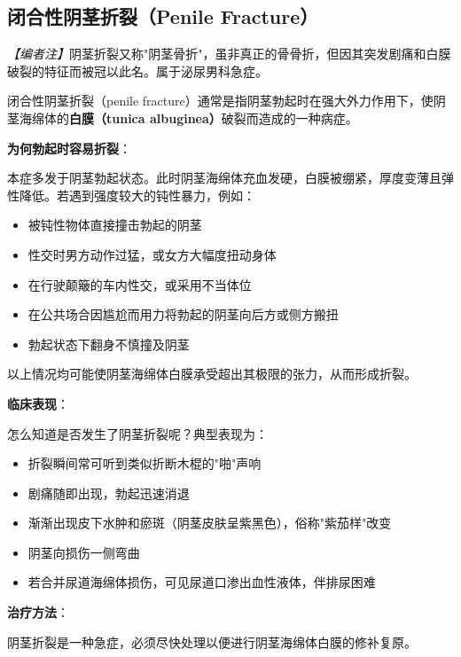 \documentclass[12pt,a4paper,twoside]{ctexbook}
\begin{document}
\subsection{闭合性阴茎折裂（Penile Fracture）}

\noindent\textit{【编者注】}阴茎折裂又称"阴茎骨折"，虽非真正的骨骨折，但因其突发剧痛和白膜破裂的特征而被冠以此名。属于泌尿男科急症。

\vspace{0.5em}
闭合性阴茎折裂（penile fracture）通常是指阴茎勃起时在强大外力作用下，使阴茎海绵体的\textbf{白膜（tunica albuginea）}破裂而造成的一种病症。

\vspace{0.5em}
\noindent\textbf{为何勃起时容易折裂}：

本症多发于阴茎勃起状态。此时阴茎海绵体充血发硬，白膜被绷紧，厚度变薄且弹性降低。若遇到强度较大的钝性暴力，例如：
\begin{itemize}
	\item 被钝性物体直接撞击勃起的阴茎
	\item 性交时男方动作过猛，或女方大幅度扭动身体
	\item 在行驶颠簸的车内性交，或采用不当体位
	\item 在公共场合因尴尬而用力将勃起的阴茎向后方或侧方搬扭
	\item 勃起状态下翻身不慎撞及阴茎
\end{itemize}
以上情况均可能使阴茎海绵体白膜承受超出其极限的张力，从而形成折裂。

\vspace{0.5em}
\noindent\textbf{临床表现}：

怎么知道是否发生了阴茎折裂呢？典型表现为：
\begin{itemize}
	\item 折裂瞬间常可听到类似折断木棍的"啪"声响
	\item 剧痛随即出现，勃起迅速消退
	\item 渐渐出现皮下水肿和瘀斑（阴茎皮肤呈紫黑色），俗称"紫茄样"改变
	\item 阴茎向损伤一侧弯曲
	\item 若合并尿道海绵体损伤，可见尿道口渗出血性液体，伴排尿困难
\end{itemize}

\vspace{0.5em}
\noindent\textbf{治疗方法}：

阴茎折裂是一种急症，必须尽快处理以便进行阴茎海绵体白膜的修补复原。
\end{document}
